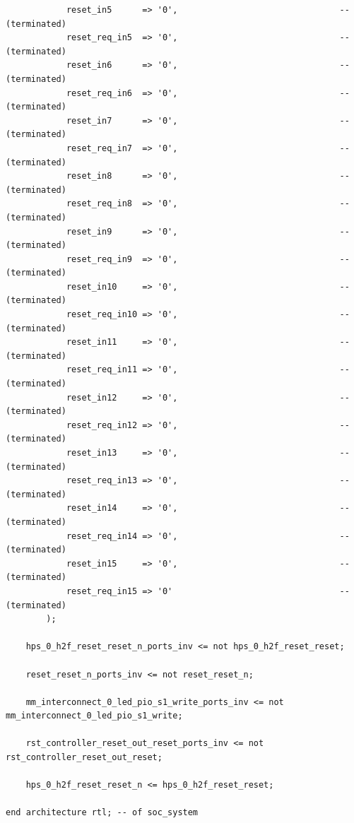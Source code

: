 \documentclass[conference]{IEEEtran}
\begin{document}
\begin{lstlisting}
			reset_in5      => '0',                                -- (terminated)
			reset_req_in5  => '0',                                -- (terminated)
			reset_in6      => '0',                                -- (terminated)
			reset_req_in6  => '0',                                -- (terminated)
			reset_in7      => '0',                                -- (terminated)
			reset_req_in7  => '0',                                -- (terminated)
			reset_in8      => '0',                                -- (terminated)
			reset_req_in8  => '0',                                -- (terminated)
			reset_in9      => '0',                                -- (terminated)
			reset_req_in9  => '0',                                -- (terminated)
			reset_in10     => '0',                                -- (terminated)
			reset_req_in10 => '0',                                -- (terminated)
			reset_in11     => '0',                                -- (terminated)
			reset_req_in11 => '0',                                -- (terminated)
			reset_in12     => '0',                                -- (terminated)
			reset_req_in12 => '0',                                -- (terminated)
			reset_in13     => '0',                                -- (terminated)
			reset_req_in13 => '0',                                -- (terminated)
			reset_in14     => '0',                                -- (terminated)
			reset_req_in14 => '0',                                -- (terminated)
			reset_in15     => '0',                                -- (terminated)
			reset_req_in15 => '0'                                 -- (terminated)
		);

	hps_0_h2f_reset_reset_n_ports_inv <= not hps_0_h2f_reset_reset;

	reset_reset_n_ports_inv <= not reset_reset_n;

	mm_interconnect_0_led_pio_s1_write_ports_inv <= not mm_interconnect_0_led_pio_s1_write;

	rst_controller_reset_out_reset_ports_inv <= not rst_controller_reset_out_reset;

	hps_0_h2f_reset_reset_n <= hps_0_h2f_reset_reset;

end architecture rtl; -- of soc_system

\end{lstlisting}
\end{document}
